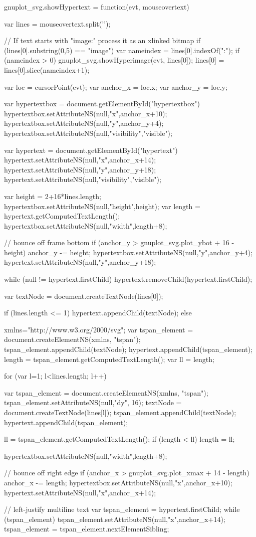gnuplot_svg.showHypertext = function(evt, mouseovertext)
{
    var lines = mouseovertext.split('\n');

    // If text starts with "image:" process it as an xlinked bitmap
    if (lines[0].substring(0,5) == "image") {
	var nameindex = lines[0].indexOf(":");
	if (nameindex > 0) {
	    gnuplot_svg.showHyperimage(evt, lines[0]);
	    lines[0] = lines[0].slice(nameindex+1);
	}
    }

    var loc = cursorPoint(evt);
    var anchor_x = loc.x;
    var anchor_y = loc.y;
	
    var hypertextbox = document.getElementById("hypertextbox")
    hypertextbox.setAttributeNS(null,"x",anchor_x+10);
    hypertextbox.setAttributeNS(null,"y",anchor_y+4);
    hypertextbox.setAttributeNS(null,"visibility","visible");

    var hypertext = document.getElementById("hypertext")
    hypertext.setAttributeNS(null,"x",anchor_x+14);
    hypertext.setAttributeNS(null,"y",anchor_y+18);
    hypertext.setAttributeNS(null,"visibility","visible");

    var height = 2+16*lines.length;
    hypertextbox.setAttributeNS(null,"height",height);
    var length = hypertext.getComputedTextLength();
    hypertextbox.setAttributeNS(null,"width",length+8);

    // bounce off frame bottom
    if (anchor_y > gnuplot_svg.plot_ybot + 16 - height) {
	anchor_y -= height;
	hypertextbox.setAttributeNS(null,"y",anchor_y+4);
	hypertext.setAttributeNS(null,"y",anchor_y+18);
    }

    while (null != hypertext.firstChild) {
        hypertext.removeChild(hypertext.firstChild);
    }

    var textNode = document.createTextNode(lines[0]);

    if (lines.length <= 1) {
	hypertext.appendChild(textNode);
    } else {
	xmlns="http://www.w3.org/2000/svg";
	var tspan_element = document.createElementNS(xmlns, "tspan");
	tspan_element.appendChild(textNode);
	hypertext.appendChild(tspan_element);
	length = tspan_element.getComputedTextLength();
	var ll = length;

	for (var l=1; l<lines.length; l++) {
	    var tspan_element = document.createElementNS(xmlns, "tspan");
	    tspan_element.setAttributeNS(null,"dy", 16);
	    textNode = document.createTextNode(lines[l]);
	    tspan_element.appendChild(textNode);
	    hypertext.appendChild(tspan_element);

	    ll = tspan_element.getComputedTextLength();
	    if (length < ll) length = ll;
	}
	hypertextbox.setAttributeNS(null,"width",length+8);
    }

    // bounce off right edge
    if (anchor_x > gnuplot_svg.plot_xmax + 14 - length) {
	anchor_x -= length;
	hypertextbox.setAttributeNS(null,"x",anchor_x+10);
	hypertext.setAttributeNS(null,"x",anchor_x+14);
    }

    // left-justify multiline text
    var tspan_element = hypertext.firstChild;
    while (tspan_element) {
	tspan_element.setAttributeNS(null,"x",anchor_x+14);
	tspan_element = tspan_element.nextElementSibling;
    }

}

